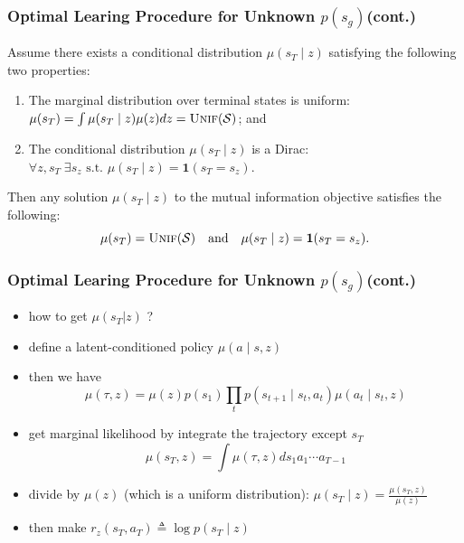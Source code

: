 \documentclass[aspectratio=169]{beamer}
\begin{document}
\begin{frame}
  \frametitle{Optimal Learing Procedure for Unknown $p(s_g)$(cont.)}
  \begin{lemma} \label{lemma:MImax}
    Assume there exists a conditional distribution $\mu(s_T \mid z)$ satisfying the following two properties:
    \begin{enumerate}
        \item The marginal distribution over terminal states is uniform: $\mu(s_T) = \int \mu(s_T \mid z) \mu(z) dz = \textsc{Unif}({\mathcal{S}})$; and
        \item The conditional distribution $\mu(s_T \mid z)$ is a Dirac: $\forall z, s_T \; \exists s_z \text{ s.t. } \mu(s_T \mid z) = \mathbf{1}(s_T = s_z)$.
    \end{enumerate}
    Then any solution $\mu(s_T \mid z)$ to the mutual information objective satisfies the following:
    \begin{equation*}
    \mu(s_T) = \textsc{Unif}({\mathcal{S}}) \quad \text{and} \quad \mu(s_T \mid z) = \mathbf{1}(s_T = s_z).
    \end{equation*}
    \end{lemma}
\end{frame}

\begin{frame}
  \frametitle{Optimal Learing Procedure for Unknown $p(s_g)$(cont.)}
  \begin{itemize}
    \item how to get $\mu(s_T | z)$ ?
    \item define a latent-conditioned policy $\mu(a \mid s,z)$
    \item then we have\\ $$\mu(\tau, z)=\mu(z) p\left(s_{1}\right) \prod_{t} p\left(s_{t+1} \mid s_{t}, a_{t}\right) \mu\left(a_{t} \mid s_{t}, z\right)$$
    \item get marginal likelihood by integrate the trajectory except $s_T$\\$$\mu\left(s_{T}, z\right)=\int \mu(\tau, z) d s_{1} a_{1} \cdots a_{T-1}$$
    \item divide by $\mu(z)$ (which is a uniform distribution): $\mu(s_T\mid z) = \frac{\mu\left(s_{T}, z\right)}{\mu(z)}$
    \item then make $r_{z}\left(s_{T}, a_{T}\right) \triangleq \log p\left(s_{T} \mid z\right)$
  \end{itemize}
\end{frame}
\end{document}
